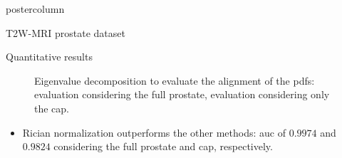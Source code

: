 \documentclass[final, size=a0]{beamer}
\begin{document}
\begin{frame}
\begin{columns}
\begin{column}{.33\textwidth}
\begin{beamercolorbox}[center,wd=\textwidth]{postercolumn}
\begin{minipage}[T]{.95\textwidth}
{\begin{block}{T2W-MRI prostate dataset}
            \end{block}

            \vspace{.2cm}

            \begin{block}{Quantitative results}
              \begin{figure}
                \centering
                \hfill
                \caption{Eigenvalue decomposition to evaluate the alignment of the \acs{pdf}s: \protect{} evaluation considering the full prostate, \protect{} evaluation considering only the \ac{cap}.}
                \label{fig:qt}
              \end{figure}
              
              \begin{itemize}
              \justifying
              \item Rician normalization outperforms the other methods: \acs{auc} of $0.9974$ and $0.9824$ considering the full prostate and \ac{cap}, respectively.
              \end{itemize}

            \end{block}
            
}
\end{minipage}
\end{beamercolorbox}
\end{column}
\end{columns}
\end{frame}
\end{document}
